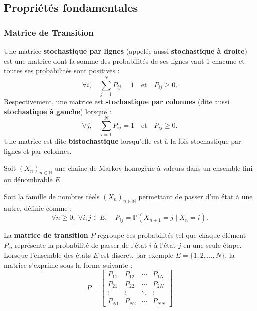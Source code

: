 \documentclass{article}
\begin{document}
\subsection{Propriétés fondamentales}


\subsubsection{Matrice de Transition}

\begin{tcolorbox}[colback=white,colframe=blue!80!black,title=Matrice stochastique par lignes/par colonnes]

  Une matrice \textbf{stochastique par lignes} (appelée aussi \textbf{stochastique à droite}) est une matrice dont la somme des probabilités de ses lignes vaut 1 chacune et toutes ses probabilités sont positives :
  \[
  \forall i, \quad \sum_{j=1}^{N} P_{ij} = 1 \quad \text{et} \quad P_{ij} \geq 0.
  \]
  Respectivement, une matrice est \textbf{stochastique par colonnes} (dite aussi \textbf{stochastique à gauche}) lorsque :
  \[
  \forall j, \quad \sum_{i=1}^{N} P_{ij} = 1 \quad \text{et} \quad P_{ij} \geq 0.
  \]
  Une matrice est dite \textbf{bistochastique} lorsqu'elle est à la fois stochastique par lignes et par colonnes.
\end{tcolorbox}

\begin{tcolorbox}[colback=white,colframe=red!80!black,title=Matrice de Transition]
Soit $(X_n)_{n \in \mathbb{N}}$ une chaîne de Markov homogène à valeurs dans un ensemble fini ou dénombrable $E$.

Soit la famille de nombres réels $(X_n)_{n \in \mathbb{N}}$ permettant de passer d'un état à une autre, définie comme :
\[
\forall n \geq 0,\; \forall i,j \in E,\quad P_{ij} = \mathbb{P}(X_{n+1} = j \mid X_n = i).
\]

La \textbf{matrice de transition} $P$ regroupe ces probabilités tel que chaque élément $P_{ij}$ représente la probabilité de passer de l'état $i$ à l'état $j$ en une seule étape.
Lorsque l'ensemble des états $E$ est discret, par exemple $E = \{1, 2, \dots, N\}$, la matrice s'exprime sous la forme suivante :
\[
P = \begin{bmatrix}
P_{11} & P_{12} & \cdots & P_{1N}\\[1mm]
P_{21} & P_{22} & \cdots & P_{2N}\\[1mm]
\vdots & \vdots & \ddots & \vdots\\[1mm]
P_{N1} & P_{N2} & \cdots & P_{NN}
\end{bmatrix}
\]

\end{tcolorbox}
\end{document}
